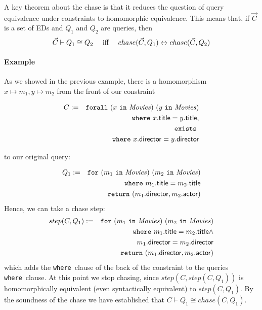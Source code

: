 \documentclass[preprint]{sigplanconf}
\newcommand{\FOR}{{\tt for}\relax\ifmmode\ \else\xspace\fi}
\newcommand{\FORALL}{{\tt forall}\relax\ifmmode\ \else\xspace\fi}
\newcommand{\EXISTS}{{\tt exists}\relax\ifmmode\ \else\xspace\fi}
\newcommand{\WHERE}{{\tt where}\relax\ifmmode\ \else\xspace\fi}
\newcommand{\IN}{ \ {\tt in} \ }
\newcommand{\RETURN}{{\tt return}\relax\ifmmode\ \else\xspace\fi}
\newcommand{\relation}[1]{\ensuremath{\mathit{#1}}\xspace}
\begin{document}
A key theorem about the chase is that it reduces the question of query equivalence under constraints to homomorphic equivalence.
This means that, if $\vec{C}$ is a set of EDs and $Q_1$ and $Q_2$ are queries, then
\[
\vec{C} \vdash Q_1 \cong Q_2 \ \ \ \  \textnormal{iff} \ \ \ \ chase(\vec{C},Q_1) \leftrightarrow chase(\vec{C}, Q_2)
\]
\paragraph{Example}
As we showed in the previous example, there is a homomorphism $x \mapsto m_1, y \mapsto m_2$ from the front of our constraint
\begin{normalsize}
\begin{eqnarray*}
C& := & \FORALL (x \IN \relation{Movies}) \ (y \IN \relation{Movies}) \\
& & \WHERE x.{\sf title} = y.{\sf title}, \\ 
& & \EXISTS \\
& & \WHERE x.{\sf director} = y.{\sf director}
\end{eqnarray*}
\end{normalsize}
to our original query:

\begin{eqnarray*}
Q_1 & := & \FOR (m_1 \IN \relation{Movies}) \ (m_2 \IN \relation{Movies}) \\
 & & \WHERE m_1.{\sf title} = m_2.{\sf title} \\
 & & \RETURN (m_1.{\sf director}, m_2.{\sf actor})
\end{eqnarray*}
Hence, we can take a chase step:
\begin{eqnarray*}
step(C, Q_1) & := & \FOR (m_1 \IN \relation{Movies}) \ (m_2 \IN \relation{Movies}) \\
 & & \WHERE m_1.{\sf title} = m_2.{\sf title} \wedge \\
 & & \ \ \ \ \ \ \ \ \ \ \ \  m_1.{\sf director} = m_2.{\sf 
director} \\
 & & \RETURN (m_1.{\sf director}, m_2.{\sf actor})
\end{eqnarray*}
which adds the \WHERE clause of the back of the constraint to the queries \WHERE clause.
At this point we stop chasing, since $step(C, step(C, Q_1))$ is homomorphically equivalent (even syntactically equivalent) to $step(C, Q_1)$.
By the soundness of the chase we have established that $C \vdash Q_1 \cong chase(C, Q_1)$.
\end{document}
